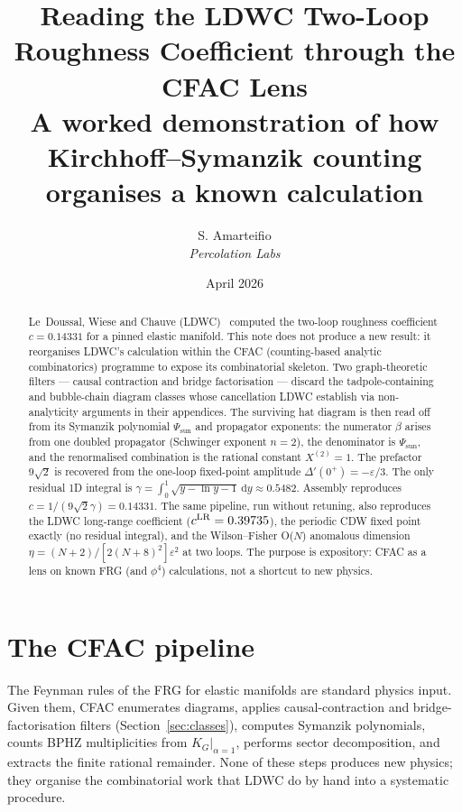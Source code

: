 \documentclass[10pt,a4paper,twocolumn]{article}
\title{Reading the LDWC Two-Loop Roughness Coefficient
  through the CFAC Lens\\[2pt]
  \large A worked demonstration of how Kirchhoff--Symanzik
  counting organises a known calculation}
\author{S. Amarteifio\\
  \small\textit{Percolation Labs}}
\date{April 2026}
\theoremstyle{plain}
\theoremstyle{definition}
\newcommand{\dd}{\mathrm{d}}
\renewcommand{\Psi}{\varPsi}
\newcommand{\eps}{\varepsilon}
\begin{document}
\maketitle

\begin{abstract}
Le~Doussal, Wiese and Chauve (LDWC)~\citep{LDWC2002} computed the
two-loop roughness coefficient $c = 0.14331$ for a pinned elastic
manifold.  This note does not produce a new result: it reorganises
LDWC's calculation within the CFAC (counting-based analytic
combinatorics) programme to expose its combinatorial skeleton.
Two graph-theoretic filters --- causal contraction and bridge
factorisation --- discard the tadpole-containing and bubble-chain
diagram classes whose cancellation LDWC establish via
non-analyticity arguments in their appendices.
The surviving hat diagram is then read off from its Symanzik
polynomial $\Psi_{\text{sun}}$ and propagator exponents: the
numerator $\beta$ arises from one doubled propagator (Schwinger
exponent $n=2$), the denominator is $\Psi_{\text{sun}}$, and the
renormalised combination is the rational constant $X^{(2)} = 1$.
The prefactor $9\sqrt{2}$ is recovered from the one-loop
fixed-point amplitude $\Delta'(0^+) = -\eps/3$.  The only residual
1D integral is $\gamma = \int_0^1\sqrt{y - \ln y - 1}\,\dd y
\approx 0.5482$.  Assembly reproduces $c = 1/(9\sqrt{2}\gamma)
= 0.14331$.  The same pipeline, run without retuning, also
reproduces the LDWC long-range coefficient ($c^{\rm LR}=0.39735$),
the periodic CDW fixed point exactly (no residual integral),
and the Wilson--Fisher O($N$) anomalous dimension
$\eta = (N{+}2)/[2(N{+}8)^2]\eps^2$ at two loops.
The purpose is expository: CFAC as a lens on known FRG (and
$\phi^4$) calculations, not a shortcut to new physics.
\end{abstract}

\tableofcontents

\section{The CFAC pipeline}
\label{sec:pipeline}

The Feynman rules of the FRG for elastic manifolds are standard
physics input.  Given them, CFAC enumerates diagrams, applies
causal-contraction and bridge-factorisation filters
(Section~\ref{sec:classes}), computes Symanzik polynomials, counts
BPHZ multiplicities from $K_G|_{\alpha=1}$, performs sector
decomposition, and extracts the finite rational remainder.
None of these steps produces new physics; they organise the
combinatorial work that LDWC do by hand into a systematic
procedure.
\end{document}
